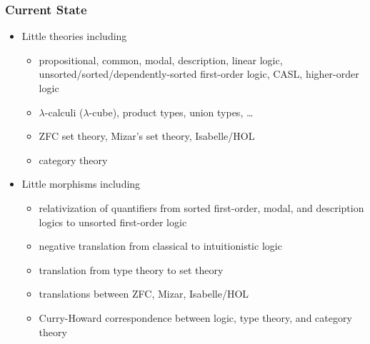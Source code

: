 \documentclass{beamer}
\begin{document}
\begin{frame}\frametitle{Current State}
	\begin{itemize}
		\item Little theories including
		\begin{itemize}
			\item propositional, common, modal, description, linear logic, unsorted/sorted/dependently-sorted first-order logic, CASL, higher-order logic
			\item $\lambda$-calculi ($\lambda$-cube), product types, union types, \ldots
			\item ZFC set theory, Mizar's set theory, Isabelle/HOL
			\item category theory
		\end{itemize}
		\item Little morphisms including
		\begin{itemize}
			\item relativization of quantifiers from sorted first-order, modal, and description logics to unsorted first-order logic
			\item negative translation from classical to intuitionistic logic
			\item translation from type theory to set theory
			\item translations between ZFC, Mizar, Isabelle/HOL
			\item Curry-Howard correspondence between logic, type theory, and category theory
		\end{itemize}
	\end{itemize}
\end{frame}

\end{document}
